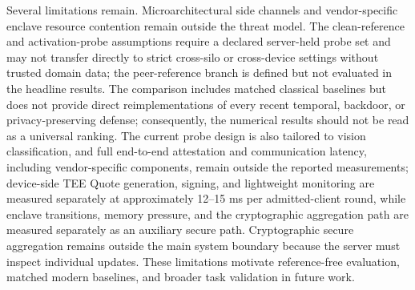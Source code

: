 \documentclass[runningheads,orivec]{llncs}
\begin{document}
Several limitations remain. Microarchitectural side channels and vendor-specific enclave resource contention remain outside the threat model. The clean-reference and activation-probe assumptions require a declared server-held probe set and may not transfer directly to strict cross-silo or cross-device settings without trusted domain data; the peer-reference branch is defined but not evaluated in the headline results. The comparison includes matched classical baselines but does not provide direct reimplementations of every recent temporal, backdoor, or privacy-preserving defense; consequently, the numerical results should not be read as a universal ranking. The current probe design is also tailored to vision classification, and full end-to-end attestation and communication latency, including vendor-specific components, remain outside the reported measurements; device-side TEE Quote generation, signing, and lightweight monitoring are measured separately at approximately 12--15 ms per admitted-client round, while enclave transitions, memory pressure, and the cryptographic aggregation path are measured separately as an auxiliary secure path. Cryptographic secure aggregation remains outside the main system boundary because the server must inspect individual updates. These limitations motivate reference-free evaluation, matched modern baselines, and broader task validation in future work.
\end{document}
